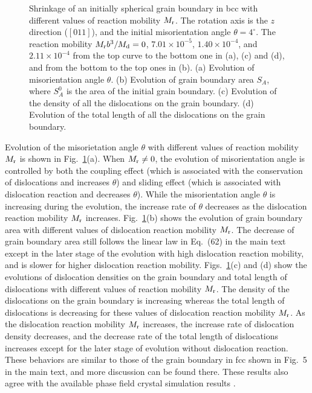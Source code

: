 \documentclass[smallextended]{svjour3}
\begin{document}
\begin{figure}[htbp]
	\centering
	\caption{ Shrinkage of an initially spherical grain boundary in bcc with different values of reaction mobility $M_{\rm r}$. The rotation axis is the $z$ direction ($[011]$), and the initial misorientation angle $\theta=4^\circ$.   The reaction mobility $M_{\rm r}b^3/M_{\rm d}=0$, $7.01\times10^{-5}$, $1.40\times10^{-4}$, and $2.11\times10^{-4}$ from the top curve to the bottom one in (a), (c) and (d), and from the bottom to the top ones in (b).
(a) Evolution of  misorientation angle $\theta$. (b) Evolution of grain boundary area $S_A$, where $S_A^0$ is the area of the initial grain boundary. (c) Evolution of the density of all the dislocations on the grain boundary. (d) Evolution of the total length of all the dislocations on the grain boundary. }\label{fig:bcctheta}
\end{figure}

Evolution of the misorietation angle $\theta$ with different values of reaction mobility $M_{\rm r}$ is shown in Fig.~\ref{fig:bcctheta}(a). When $M_{\rm r}\neq 0$, the evolution of misorientation angle is controlled by both the coupling effect (which is associated with the conservation of dislocations and increases $\theta$) and sliding effect (which is associated with dislocation reaction and decreases $\theta$). While the misorientation angle $\theta$ is increasing during the evolution, the increase rate of $\theta$ decreases as
  the dislocation reaction mobility $M_{\rm r}$ increases.
Fig.~\ref{fig:bcctheta}(b) shows the evolution of grain boundary area with different values of dislocation reaction mobility $M_{\rm r}$. The decrease of grain boundary area still follows the linear law in Eq.~(62) in the main text except in the later stage of the evolution with high dislocation reaction mobility,  and is slower for higher dislocation reaction mobility.
Figs.~\ref{fig:bcctheta}(c) and (d) show the evolutions of dislocation densities on the grain boundary and total length of dislocations with different values of reaction mobility $M_{\rm r}$. The density of the dislocations on the grain boundary is increasing whereas the total length of dislocations is decreasing for these values of dislocation reaction mobility $M_{\rm r}$.
As the dislocation reaction mobility $M_{\rm r}$ increases, the increase rate of dislocation density  decreases, and the decrease rate of the total length of dislocations increases except for the later stage of evolution without dislocation reaction. These behaviors are similar to those of the grain boundary in fcc shown in  Fig.~5 in the main text, and more discussion can be found there. These results also agree with the available phase field crystal simulation results \cite{yamanaka2017phase,salvalaglio2018defects}.
\end{document}
